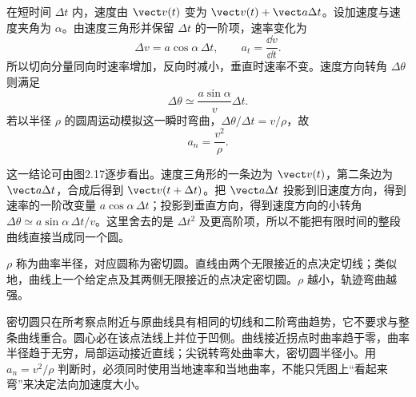 在短时间 $\Delta t$ 内，速度由 $\vect v(t)$ 变为 $\vect v(t)+\vect a\Delta t$。设加速度与速度夹角为 $\alpha$。由速度三角形并保留 $\Delta t$ 的一阶项，速率变化为
\begin{equation}
 \Delta v=a\cos\alpha\,\Delta t,
 \qquad \boxed{a_t=\frac{\dd v}{\dd t}}.
\end{equation}
所以切向分量同向时速率增加，反向时减小，垂直时速率不变。速度方向转角 $\Delta\theta$ 则满足
\begin{equation}
 \Delta\theta\simeq\frac{a\sin\alpha}{v}\Delta t.
\end{equation}
若以半径 $\rho$ 的圆周运动模拟这一瞬时弯曲，$\Delta\theta/\Delta t=v/\rho$，故
\begin{equation}
 \boxed{a_n=\frac{v^2}{\rho}}.
\end{equation}

\VelocityIncrementNaturalDiagram

这一结论可由图2.17逐步看出。速度三角形的一条边为 $\vect v(t)$，第二条边为 $\vect a\Delta t$，合成后得到 $\vect v(t+\Delta t)$。把 $\vect a\Delta t$ 投影到旧速度方向，得到速率的一阶改变量 $a\cos\alpha\,\Delta t$；投影到垂直方向，得到速度方向的小转角 $\Delta\theta\simeq a\sin\alpha\,\Delta t/v$。这里舍去的是 $\Delta t^2$ 及更高阶项，所以不能把有限时间的整段曲线直接当成同一个圆。

\OsculatingCircleDiagram

$\rho$ 称为曲率半径，对应圆称为密切圆。直线由两个无限接近的点决定切线；类似地，曲线上一个给定点及其两侧无限接近的点决定密切圆。$\rho$ 越小，轨迹弯曲越强。

密切圆只在所考察点附近与原曲线具有相同的切线和二阶弯曲趋势，它不要求与整条曲线重合。圆心必在该点法线上并位于凹侧。曲线接近拐点时曲率趋于零，曲率半径趋于无穷，局部运动接近直线；尖锐转弯处曲率大，密切圆半径小。用 $a_n=v^2/\rho$ 判断时，必须同时使用当地速率和当地曲率，不能只凭图上“看起来弯”来决定法向加速度大小。

